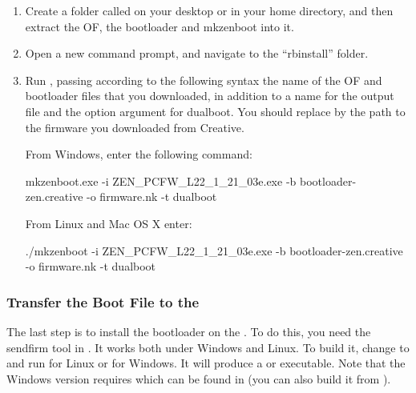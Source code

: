 \begin{enumerate}

\item Create a folder called  on your desktop or in your home
  directory, and then extract the OF, the bootloader and mkzenboot into it.

\item Open a new command prompt, and navigate to the ``rbinstall'' folder.

\item Run , passing according to the following syntax the name
  of the OF and bootloader files that you downloaded, in addition to a name for
  the output file and the option argument for dualboot.
  You should replace  by the path to the
  firmware you downloaded from Creative.

  From Windows, enter the following command:
  \begin{code}[firstline=\opt{creativezen}{1},%
              lastline=\opt{creativezen}{1}]
    mkzenboot.exe -i ZEN_PCFW_L22_1_21_03e.exe -b bootloader-zen.creative -o firmware.nk -t dualboot
  \end{code}
  From Linux and Mac OS X enter:%
  \begin{code}[firstline=\opt{creativezen}{1},%
              lastline=\opt{creativezen}{1}]
    ./mkzenboot -i ZEN_PCFW_L22_1_21_03e.exe -b bootloader-zen.creative -o firmware.nk -t dualboot
  \end{code}

\end{enumerate}

\subsubsection{Transfer the Boot File to the \dap}

The last step is to install the bootloader on the \dap{}.
To do this, you need the sendfirm tool in . It works both
under Windows and Linux. To build it, change to  and run
 for Linux or  for Windows. It will produce
a  or  executable. Note that the Windows
version requires  which can be found in 
(you can also build it from ).

